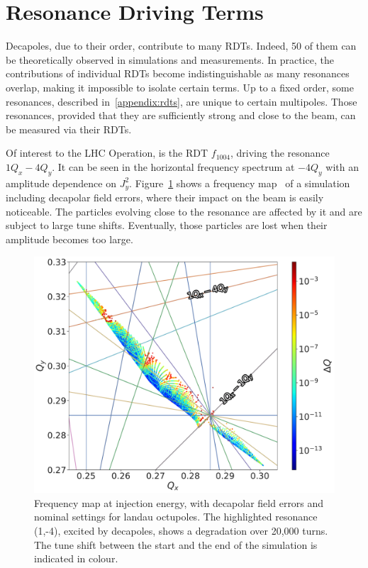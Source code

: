 \section{Resonance Driving Terms}

Decapoles, due to their order, contribute to many RDTs. Indeed, 50 of them can be theoretically 
observed in simulations and measurements. In practice, the contributions of individual RDTs
become indistinguishable as many resonances overlap, making it impossible to isolate certain terms.
Up to a fixed order, some resonances, described in~\cref{appendix:rdts}, are unique to
certain multipoles. Those resonances, provided that they are sufficiently strong and close to the
beam, can be measured via their RDTs.

Of interest to the LHC Operation, is the RDT $f_{1004}$, driving the resonance $1Q_x - 4Q_y$.
It can be seen in the horizontal frequency spectrum at $-4Q_y$ with an amplitude dependence on
$J_y^2$. 
Figure~\cref{fig:decapoles:rdts:tune_diagram} shows a frequency
map~\cite{yannis_papaphilippou_detecting_nodate} of a simulation including decapolar field errors,
where their impact on the beam is easily noticeable. The  particles evolving close to the
resonance are affected by it and are subject to large tune shifts. Eventually, those particles are 
lost when their amplitude becomes too large.

\begin{figure}[H]
    \centering
    \includegraphics[width=1\textwidth]{./images/tune_diagram_f1004.pdf}
    \caption{Frequency map at injection energy, with decapolar field errors and nominal settings for
    landau octupoles. The highlighted resonance (1,-4), excited by decapoles, shows a degradation
    over 20,000 turns. The tune shift between the start and the end of the simulation is indicated
    in colour. }
    \label{fig:decapoles:rdts:tune_diagram}
\end{figure}

